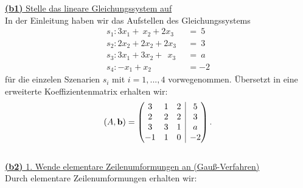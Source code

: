 \underline{\textbf{(b1)} Stelle das lineare Gleichungssystem auf}\\
In der Einleitung haben wir das Aufstellen des Gleichungssystems
\begin{align*}
	s_1 : 3x_1 +  \ x_2 + 2 x_3 \ &=\ 5\\
	s_2 : 2x_2 + 2 x_2 + 2 x_3 \ &= \ 3\\
	s_3 : 3x_1 + 3x_2 + \ \ x_3 \ &= \ a \ \\
	s_4 : -x_1 + x_2 \qquad \quad \ \ &= -2
\end{align*}
für die einzelen Szenarien $s_i$ mit $i = 1,...,4$ vorwegenommen.
Übersetzt in eine erweiterte Koeffizientenmatrix erhalten wir:
\begin{align*}
	(A,\mathbf{b})
	=
	\begin{pmatrix}
		3 & 1 & 2 & \BAR & 5\\
		2 & 2 & 2 & \BAR & 3\\
		3 & 3 & 1 & \BAR & a \\
		-1 & 1 & 0 & \BAR & -2
	\end{pmatrix}.
\end{align*}
\ \\
\underline{\textbf{(b2)} 1. Wende elementare Zeilenumformungen an (Gauß-Verfahren)}\\
Durch elementare Zeilenumformungen erhalten wir:
